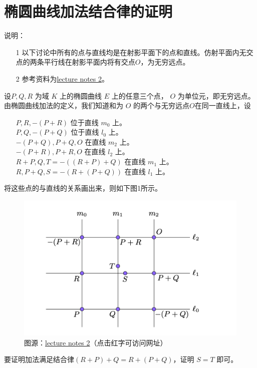 \documentclass{article}
\date{\today}
\begin{document}
\makecover
\section*{椭圆曲线加法结合律的证明}
说明：
\begin{itemize}
\item[1]
以下讨论中所有的点与直线均是在射影平面下的点和直线。仿射平面内无交点的两条平行线在射影平面内将有交点$O$，为无穷远点。
\item[2]
参考资料为\href{https://math.mit.edu/classes/18.783/2019/LectureNotes2.pdf}{lecture notes 2}。
\end{itemize}

设$P,Q,R$ 为域 $K$ 上的椭圆曲线 $E$  上的任意三个点， $O$ 为单位元，即无穷远点。由椭圆曲线加法的定义，我们知道和为 $O$ 的两个与无穷远点$O$在同一直线上，设
\begin{itemize}
\item[]
$P,R,-(P+R)$ 位于直线 $m_0$ 上。\\
$P,Q,-(P+Q)$ 位于直线 $l_0$ 上。\\
$-(P+Q),P+Q,O$ 在直线 $m_2$ 上。\\
$-(P+R),P+R,O$ 在直线 $l_2$ 上。\\
$R+P,Q,T=-((R+P)+Q)$ 在直线 $m_1$ 上。\\
$R,P+Q,S=-(R+(P+Q))$ 在直线 $l_1$ 上。\\
\end{itemize}
将这些点的与直线的关系画出来，则如下图1所示。\\
\begin{figure}[htbp]
\centering
\includegraphics[scale=0.8]{elliptical.png}
\caption{图源：\href{https://math.mit.edu/classes/18.783/2019/LectureNotes2.pdf}{lecture notes 2}（点击红字可访问网址）}
\end{figure}
要证明加法满足结合律$(R+P)+Q=R+(P+Q)$，证明 $S=T$ 即可。\\
\end{document}
